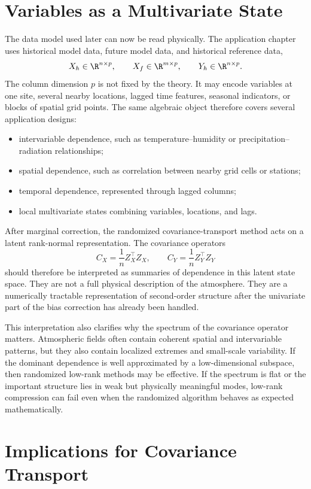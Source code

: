 \section{Variables as a Multivariate State}

The data model used later can now be read physically. The application chapter
uses historical model data, future model data, and historical reference data,
\[
	X_h \in \R^{n \times p}, \qquad
	X_f \in \R^{m \times p}, \qquad
	Y_h \in \R^{n \times p}.
\]
The column dimension \(p\) is not fixed by the theory. It may encode variables at
one site, several nearby locations, lagged time features, seasonal indicators, or
blocks of spatial grid points. The same algebraic object therefore covers several
application designs:
\begin{itemize}
	\item intervariable dependence, such as temperature--humidity or
	      precipitation--radiation relationships;
	\item spatial dependence, such as correlation between nearby grid cells or
	      stations;
	\item temporal dependence, represented through lagged columns;
	\item local multivariate states combining variables, locations, and lags.
\end{itemize}

After marginal correction, the randomized covariance-transport method acts on a
latent rank-normal representation. The covariance operators
\[
	C_X = \frac1n Z_X^\top Z_X,
	\qquad
	C_Y = \frac1n Z_Y^\top Z_Y
\]
should therefore be interpreted as summaries of dependence in this latent state
space. They are not a full physical description of the atmosphere. They are a
numerically tractable representation of second-order structure after the
univariate part of the bias correction has already been handled.

This interpretation also clarifies why the spectrum of the covariance operator
matters. Atmospheric fields often contain coherent spatial and intervariable
patterns, but they also contain localized extremes and small-scale variability.
If the dominant dependence is well approximated by a low-dimensional subspace,
then randomized low-rank methods may be effective. If the spectrum is flat or the
important structure lies in weak but physically meaningful modes, low-rank
compression can fail even when the randomized algorithm behaves as expected
mathematically.

\section{Implications for Covariance Transport}

